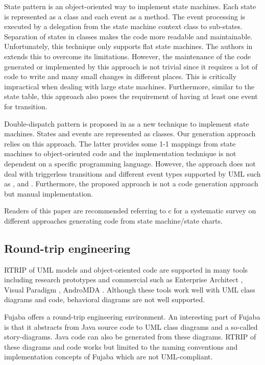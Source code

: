 State pattern \cite{Allegrini2002,Shalyto2006,Douglass1999} is an object-oriented way to implement state machines. Each state is represented as a class and each event as a method. The event processing is executed by a delegation from the state machine context class to sub-states. Separation of states in classes makes the code more readable and maintainable. Unfortunately, this technique only supports flat state machines. The authors in \cite{niaz_mapping_2004} extends this to overcome its limitations. However, the maintenance of the code generated or implemented by this approach is not trivial since it requires a lot of code to write and many small changes in different places. This is critically impractical when dealing with large state machines. Furthermore, similar to the state table, this approach also poses the requirement of having at least one event for transition.

Double-dispatch pattern is proposed in \cite{spinke_object-oriented_2013} as a new technique to implement state machines. States and events are represented as classes. Our generation approach relies on this approach. The latter provides some 1-1 mappings from state machines to object-oriented code and the implementation technique is not dependent on a specific programming language. However, the approach does not deal with triggerless transitions and different event types supported by UML such as ,  and . Furthermore, the proposed approach is not a code generation approach but manual implementation.

Readers of this paper are recommended referring to c\cite{Domnguez2012} for a systematic survey on different approaches generating code from state machine/state charts.

\subsection{Round-trip engineering}
RTRIP of UML models and object-oriented code are supported in many tools including research prototypes and commercial such as Enterprise Architect \cite{sparxsystems_enterprise_2014}, Visual Paradigm \cite{visual}, AndroMDA \cite{_andromda_}. Although these tools work well with UML class diagrams and code, behavioral diagrams are not well supported.  

Fujaba \cite{KNNZ99_2_ag} offers a round-trip engineering environment. An interesting part of Fujaba is that it abstracts from Java source code to UML class diagrams and a so-called story-diagrams. Java code can also be generated from these diagrams. RTRIP of these diagrams and code works but limited to the naming conventions and implementation concepts of Fujaba which are not UML-compliant. 

